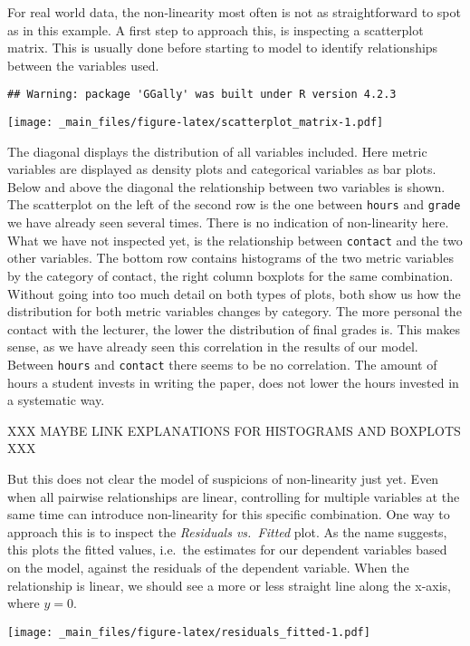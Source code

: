 \documentclass[
]{book}
\begin{document}
For real world data, the non-linearity most often is not as straightforward to
spot as in this example. A first step to approach this, is inspecting a
scatterplot matrix. This is usually done before starting to model to identify
relationships between the variables used.

\begin{verbatim}
## Warning: package 'GGally' was built under R version 4.2.3
\end{verbatim}

\texttt{[image: \_main\_files/figure-latex/scatterplot\_matrix-1.pdf]}

The diagonal displays the distribution of all variables included. Here metric
variables are displayed as density plots and categorical variables as bar plots.
Below and above the diagonal the relationship between two variables is shown.
The scatterplot on the left of the second row is the one between \texttt{hours} and
\texttt{grade} we have already seen several times. There is no indication of
non-linearity here. What we have not inspected yet, is the relationship
between \texttt{contact} and the two other variables.
The bottom row contains histograms of the two metric variables by the category
of contact, the right column boxplots for the same combination. Without going
into too much detail on both types of plots, both show us how the distribution
for both metric variables changes by category. The more personal the contact
with the lecturer, the lower the distribution of final grades is. This makes
sense, as we have already seen this correlation in the results of our model.
Between \texttt{hours} and \texttt{contact} there seems to be no correlation. The amount of
hours a student invests in writing the paper, does not lower the hours invested
in a systematic way.

XXX MAYBE LINK EXPLANATIONS FOR HISTOGRAMS AND BOXPLOTS XXX

But this does not clear the model of suspicions of non-linearity just yet. Even
when all pairwise relationships are linear, controlling for multiple variables
at the same time can introduce non-linearity for this specific combination.
One way to approach this is to inspect the \emph{Residuals vs.~Fitted} plot. As the
name suggests, this plots the fitted values, i.e.~the estimates for our
dependent variables based on the model, against the residuals of the dependent
variable. When the relationship is linear, we should see a more or less straight
line along the x-axis, where \(y = 0\).

\texttt{[image: \_main\_files/figure-latex/residuals\_fitted-1.pdf]}
\end{document}
